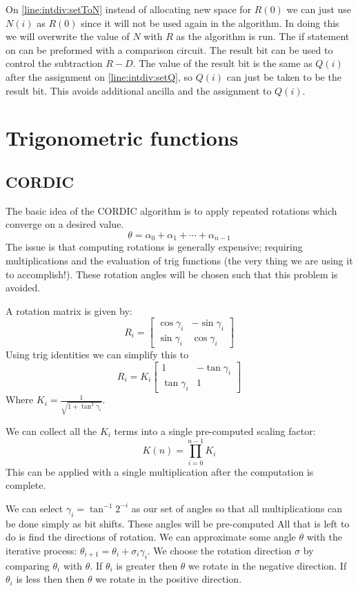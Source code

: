     On \cref{line:intdiv:setToN} instead of allocating new space for $R(0)$ we can just use $N(i)$ as $R(0)$ since it will not be used again in the algorithm.
    In doing this we will overwrite the value of $N$ with $R$ as the algorithm is run.
    The if statement on  can be preformed with a comparison circuit.
    The result bit can be used to control the subtraction $R-D$.
    The value of the result bit is the same as $Q(i)$ after the assignment on \ref{line:intdiv:setQ}, so $Q(i)$ can just be taken to be the result bit.
    This avoids additional ancilla and the assignment to $Q(i)$.


\section{Trigonometric functions}
    \subsection{CORDIC}
        The basic idea of the CORDIC\cite{V:1959} algorithm is to apply repeated rotations which converge on a desired value.
        \[ \theta = \alpha_0 + \alpha_1 + \dotsb + \alpha_{n-1} \]
        The issue is that computing rotations is generally expensive;
        requiring multiplications and the evaluation of trig functions (the very thing we are using it to accomplish!).
        These rotation angles will be chosen such that this problem is avoided.

        A rotation matrix is given by:
        \[
          R_i = \begin{bmatrix}
            \cos\gamma_i & -\sin\gamma_i \\
            \sin\gamma_i & \cos\gamma_i
          \end{bmatrix}
        \]
        Using trig identities we can simplify this to
        \[
          R_i = K_i
                \begin{bmatrix}
                  1            & -\tan\gamma_i \\
                  \tan\gamma_i & 1
                \end{bmatrix}
        \]
        Where $K_i = \frac{1}{\sqrt{1+\tan^2\gamma_i}}$.

        We can collect all the $K_i$ terms into a single pre-computed scaling factor:
        \[ K(n) = \prod_{i=0}^{n-1}K_i \]
        This can be applied with a single multiplication after the computation is complete.

        We can select $\gamma_i = \tan^{-1}2^{-i}$ as our set of angles so that all multiplications can be done simply as bit shifts.
        These angles will be pre-computed
        All that is left to do is find the directions of rotation.
        We can approximate some angle $\theta$ with the iterative process: $\theta_{i+1} = \theta_i + \sigma_i\gamma_i$.
        We choose the rotation direction $\sigma$ by comparing $\theta_i$ with $\theta$.
        If $\theta_i$ is greater then $\theta$ we rotate in the negative direction.
        If $\theta_i$ is less then then $\theta$ we rotate in the positive direction.

